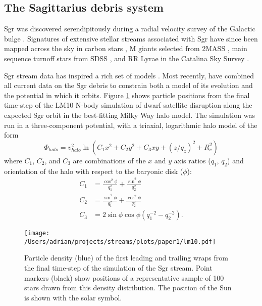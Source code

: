 \documentclass{emulateapj}
\begin{document}
\subsection{The Sagittarius debris system}
\label{sec:sgr}
Sgr was discovered serendipitously during a radial velocity 
survey of the Galactic bulge \citep{ibata94}. 
Signatures of extensive stellar
streams associated with Sgr have since  been
mapped across the sky in carbon stars \citep{totten98}, M giants
selected from 2MASS \citep{majewski03}, main
sequence turnoff stars from SDSS
\citep{belokurov06}, and RR Lyrae in the Catalina Sky Survey
\citep{drake13}. 

Sgr stream data has inspired a rich set of  models 
\citep[e.g.,][]{johnston99b, fellhauer06}.
Most recently, \citet[][hereafter LM10]{law10} have combined all
current data on the Sgr debris to constrain both a model of its evolution
and the potential in which it orbits.
Figure \ref{fig:lm10} shows particle positions
from the final time-step of the LM10 N-body
simulation of dwarf satellite disruption along the expected Sgr orbit
in the best-fitting Milky Way halo model. The simulation was
run in a three-component potential, with a triaxial, logarithmic halo
model of the form
\begin{equation}
  \Phi_{halo} = v_{halo}^2 \ln(C_1 x^2 + C_2 y^2 + C_3 xy + (z/q_z)^2 + R_c^2)
\end{equation}
where $C_1$, $C_2$, and $C_3$ are combinations of the $x$ and $y$ axis
ratios ($q_1$, $q_2$) and orientation of the halo with respect to the
baryonic disk ($\phi$):
\begin{align}
  C_1 &= \frac{\cos^2\phi}{q_1^2} + \frac{\sin^2\phi}{q_2^2}\\
  C_2 &= \frac{\sin^2\phi}{q_1^2} + \frac{\cos^2\phi}{q_2^2}\\
  C_3 &= 2\sin\phi\cos\phi \left(q_1^{-2} - q_2^{-2}\right).
\end{align}

\begin{figure}[h]
\begin{center}
\texttt{[image: /Users/adrian/projects/streams/plots/paper1/lm10.pdf]}
\caption{ Particle density (blue) of the first leading and trailing wraps from the final time-step of the \citet{law10} simulation of the Sgr stream. Point markers (black) show positions of a representative sample of 100 stars drawn from this density distribution. The position of the Sun is shown with the solar symbol. }\label{fig:lm10}
\end{center}
\end{figure}
\end{document}
